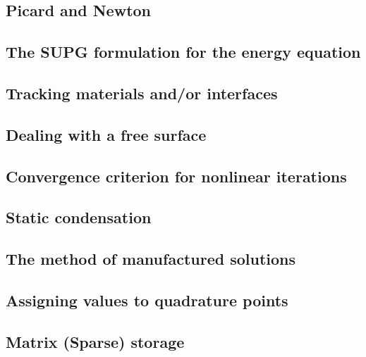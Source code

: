 \documentclass[a4paper]{article}
\begin{document}
\subsection{Picard and Newton}

\subsection{The SUPG formulation for the energy equation}

\subsection{Tracking materials and/or interfaces}

\subsection{Dealing with a free surface}

\subsection{Convergence criterion for nonlinear iterations}

\subsection{Static condensation} 

\newpage %
\subsection{The method of manufactured solutions}  %

\newpage %
\subsection{Assigning values to quadrature points}  %

\newpage %
\subsection{Matrix (Sparse) storage}  %

\newpage %
\end{document}
